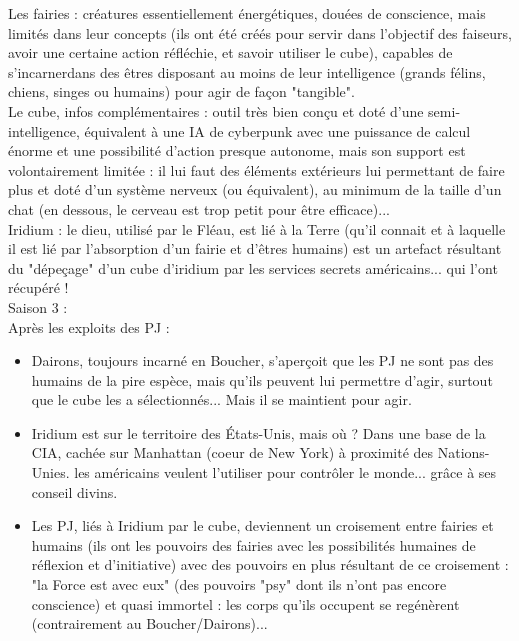 \documentclass[11pt,twoside,a4paper]{book}
\begin{document}
Les fairies : cr{\'e}atures essentiellement {\'e}nerg{\'e}tiques, dou{\'e}es de conscience, mais limit{\'e}s dans leur concepts (ils ont {\'e}t{\'e} cr{\'e}{\'e}s pour servir dans l'objectif des faiseurs, avoir une certaine action r{\'e}fl{\'e}chie, et savoir utiliser le cube), capables de s'incarnerdans des {\^e}tres disposant au moins de leur intelligence (grands f{\'e}lins, chiens, singes ou humains) pour agir de fa\c{c}on "tangible". ~\\

Le cube, infos compl{\'e}mentaires : outil tr{\`e}s bien con\c{c}u et dot{\'e} d'une semi-intelligence, {\'e}quivalent {\`a} une IA de cyberpunk avec une puissance de calcul {\'e}norme et une possibilit{\'e} d'action presque autonome, mais son support est volontairement limit{\'e}e : il lui faut des {\'e}l{\'e}ments ext{\'e}rieurs lui permettant de faire plus et dot{\'e} d'un syst{\`e}me nerveux (ou {\'e}quivalent), au minimum de la taille d'un chat (en dessous, le cerveau est trop petit pour {\^e}tre efficace)... ~\\

Iridium : le dieu, utilis{\'e} par le Fl{\'e}au, est li{\'e} {\`a} la Terre (qu'il connait et {\`a} laquelle il est li{\'e} par l'absorption d'un fairie et d'{\^e}tres humains) est un artefact r{\'e}sultant du "d{\'e}pe\c{c}age" d'un cube d'iridium par les services secrets am{\'e}ricains... qui l'ont r{\'e}cup{\'e}r{\'e} ! ~\\

Saison 3 : ~\\
Apr{\`e}s les exploits des PJ : ~\\
\begin{itemize}
	\item Dairons, toujours incarn{\'e} en Boucher, s'aper\c{c}oit que les PJ ne sont pas des humains de la pire esp{\`e}ce, mais qu'ils peuvent lui permettre d'agir, surtout que le cube les a s{\'e}lectionn{\'e}s... Mais il se maintient pour agir.
	\item Iridium est sur le territoire des {\'E}tats-Unis, mais o{\`u} ? Dans une base de la CIA, cach{\'e}e sur Manhattan (coeur de New York) {\`a} proximit{\'e} des Nations-Unies. les am{\'e}ricains veulent l'utiliser pour contr{\^o}ler le monde... gr{\^a}ce {\`a} ses conseil divins.
	\item Les PJ, li{\'e}s {\`a} Iridium par le cube, deviennent un croisement entre fairies et humains (ils ont les pouvoirs des fairies avec les possibilit{\'e}s humaines de r{\'e}flexion et d'initiative) avec des pouvoirs en plus r{\'e}sultant de ce croisement : "la Force est avec eux" (des pouvoirs "psy" dont ils n'ont pas encore conscience) et quasi immortel : les corps qu'ils occupent se reg{\'e}n{\`e}rent (contrairement au Boucher/Dairons)...
\end{itemize}~\\
\end{document}
